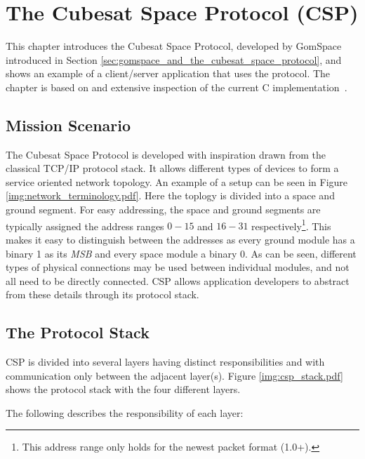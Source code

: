 \chapter{The Cubesat Space Protocol (CSP)}
\label{chapter:csp}
This chapter introduces the Cubesat Space Protocol, developed by GomSpace introduced in Section \ref{sec:gomspace_and_the_cubesat_space_protocol}, and shows an example of a client/server application that uses the protocol. The chapter is based on \cite{GomSpace, GomSpace:CSP} and extensive inspection of the current C implementation~\cite{GomSpace:CSPsrcGit}.

\section{Mission Scenario}
The Cubesat Space Protocol is developed with inspiration drawn from the classical TCP/IP protocol stack. It allows different types of devices to form a service oriented network topology. An example of a setup can be seen in Figure \ref{img:network_terminology.pdf}. Here the toplogy is divided into a space and ground segment. For easy addressing, the space and ground segments are typically assigned the address ranges $0-15$ and $16-31$ respectively\footnote{This address range only holds for the newest packet format (1.0+).}. This makes it easy to distinguish between the addresses as every ground module has a binary 1 as its \textit{MSB} and every space module a binary 0. As can be seen, different types of physical connections may be used between individual modules, and not all need to be directly connected. CSP allows application developers to abstract from these details through its protocol stack.


\section{The Protocol Stack}
CSP is divided into several layers having distinct responsibilities and with communication only between the adjacent layer(s). Figure \ref{img:csp_stack.pdf} shows the protocol stack with the four different layers.


The following describes the responsibility of each layer:

